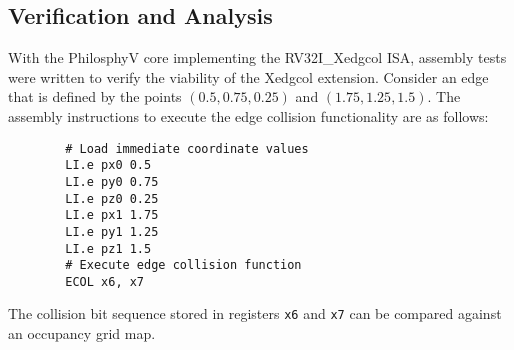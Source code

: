     \subsection{Verification and Analysis}
        With the PhilosphyV core implementing the RV32I\_Xedgcol ISA, assembly tests were written to verify the viability of the Xedgcol extension. Consider an edge that is defined by the points $(0.5, 0.75, 0.25)$ and $(1.75, 1.25, 1.5)$. The assembly instructions to execute the edge collision functionality are as follows:

        \begin{verbatim}
        # Load immediate coordinate values
        LI.e px0 0.5
        LI.e py0 0.75
        LI.e pz0 0.25
        LI.e px1 1.75
        LI.e py1 1.25
        LI.e pz1 1.5
        # Execute edge collision function
        ECOL x6, x7
        \end{verbatim}

        The collision bit sequence stored in registers \texttt{x6} and \texttt{x7} can be compared against an occupancy grid map. 